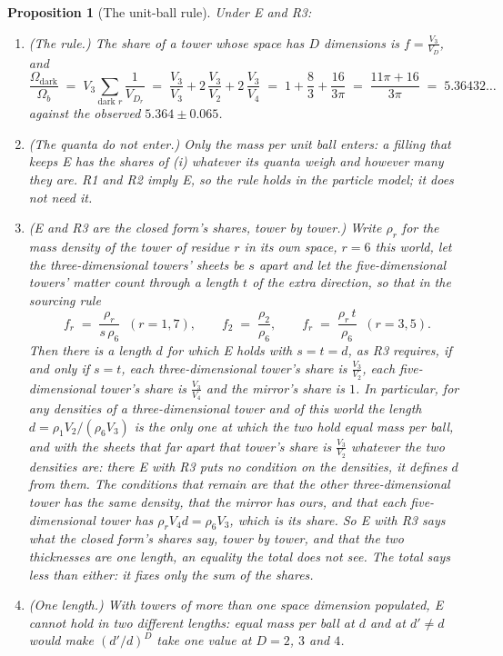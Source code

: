 \documentclass[11pt]{article}
\newtheorem{proposition}[theorem]{Proposition}
\theoremstyle{definition}
\begin{document}
\begin{proposition}[The unit-ball rule]\label{prop:rule}
Under E and R3:
\begin{enumerate}
\item[(i)] (The rule.) The share of a tower whose space has $D$ dimensions is $f = \tfrac{V_{3}}{V_{D}}$, and
\[
\frac{\Omega_{\mathrm{dark}}}{\Omega_{b}} \;=\; V_{3}\sum_{\text{dark }r}\frac{1}{V_{D_{r}}}
\;=\; \frac{V_{3}}{V_{3}} + 2\,\frac{V_{3}}{V_{2}} + 2\,\frac{V_{3}}{V_{4}}
\;=\; 1 + \frac{8}{3} + \frac{16}{3\pi} \;=\; \frac{11\pi + 16}{3\pi} \;=\; 5.36432\ldots
\]
against the observed $5.364 \pm 0.065$.
\item[(ii)] (The quanta do not enter.) Only the mass per unit ball enters: a filling that keeps E has the shares of (i) whatever its quanta weigh and however many they are. R1 and R2 imply E, so the rule holds in the particle model; it does not need it.
\item[(iii)] (E and R3 are the closed form's shares, tower by tower.) Write $\rho_{r}$ for the mass density of the tower of residue $r$ in its own space, $r = 6$ this world, let the three-dimensional towers' sheets be $s$ apart and let the five-dimensional towers' matter count through a length $t$ of the extra direction, so that in the sourcing rule
\[
f_{r} \;=\; \frac{\rho_{r}}{s\,\rho_{6}} \;\; (r = 1, 7), \qquad f_{2} \;=\; \frac{\rho_{2}}{\rho_{6}}, \qquad f_{r} \;=\; \frac{\rho_{r}\,t}{\rho_{6}} \;\; (r = 3, 5) .
\]
Then there is a length $d$ for which E holds with $s = t = d$, as R3 requires, if and only if $s = t$, each three-dimensional tower's share is $\tfrac{V_{3}}{V_{2}}$, each five-dimensional tower's share is $\tfrac{V_{3}}{V_{4}}$ and the mirror's share is $1$. In particular, for any densities of a three-dimensional tower and of this world the length $d = \rho_{1}V_{2}/(\rho_{6}V_{3})$ is the only one at which the two hold equal mass per ball, and with the sheets that far apart that tower's share is $\tfrac{V_{3}}{V_{2}}$ whatever the two densities are: there E with R3 puts no condition on the densities, it defines $d$ from them. The conditions that remain are that the other three-dimensional tower has the same density, that the mirror has ours, and that each five-dimensional tower has $\rho_{r}V_{4}d = \rho_{6}V_{3}$, which is its share. So E with R3 says what the closed form's shares say, tower by tower, and that the two thicknesses are one length, an equality the total does not see. The total says less than either: it fixes only the sum of the shares.
\item[(iv)] (One length.) With towers of more than one space dimension populated, E cannot hold in two different lengths: equal mass per ball at $d$ and at $d' \neq d$ would make $(d'/d)^{D}$ take one value at $D = 2$, $3$ and $4$.
\end{enumerate}
\end{proposition}
\end{document}
